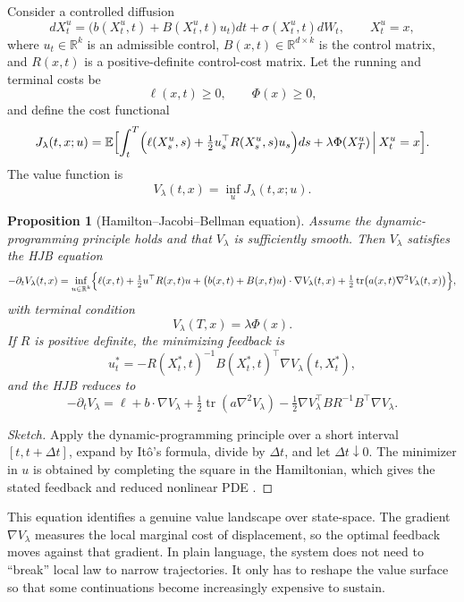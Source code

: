 \documentclass[12pt]{article}
\newtheorem{proposition}{Proposition}
\begin{document}
Consider a controlled diffusion
\[
dX_t^u = \bigl(b(X_t^u,t) + B(X_t^u,t)u_t\bigr)dt + \sigma(X_t^u,t)dW_t,
\qquad X_t^u = x,
\]
where $u_t \in \mathbb R^k$ is an admissible control, $B(x,t) \in \mathbb R^{d\times k}$ is the control matrix, and $R(x,t)$ is a positive-definite control-cost matrix. Let the running and terminal costs be
\[
\ell(x,t) \ge 0,
\qquad
\Phi(x) \ge 0,
\]
and define the cost functional
\[
J_\lambda(t,x;u) = \mathbb E\Bigl[\int_t^T \Bigl(\ell(X_s^u,s) + \tfrac12 u_s^\top R(X_s^u,s)u_s\Bigr)ds + \lambda \Phi(X_T^u)\,\Big|\,X_t^u=x\Bigr].
\]
The value function is
\[
V_\lambda(t,x) = \inf_u J_\lambda(t,x;u).
\]

\begin{proposition}[Hamilton--Jacobi--Bellman equation]
Assume the dynamic-programming principle holds and that $V_\lambda$ is sufficiently smooth. Then $V_\lambda$ satisfies the HJB equation
\[
-\partial_t V_\lambda(t,x)
= \inf_{u \in \mathbb R^k}
\Bigl\{
\ell(x,t) + \tfrac12 u^\top R(x,t)u + \bigl(b(x,t)+B(x,t)u\bigr)\cdot \nabla V_\lambda(t,x)
+ \tfrac12 \operatorname{tr}\bigl(a(x,t)\nabla^2 V_\lambda(t,x)\bigr)
\Bigr\},
\]
with terminal condition
\[
V_\lambda(T,x) = \lambda \Phi(x).
\]
If $R$ is positive definite, the minimizing feedback is
\[
u_t^* = -R(X_t^*,t)^{-1} B(X_t^*,t)^\top \nabla V_\lambda(t,X_t^*),
\]
and the HJB reduces to
\[
-\partial_t V_\lambda
= \ell + b\cdot \nabla V_\lambda + \tfrac12 \operatorname{tr}(a\nabla^2 V_\lambda)
- \tfrac12 \nabla V_\lambda^\top B R^{-1}B^\top \nabla V_\lambda.
\]
\end{proposition}

\begin{proof}[Sketch]
Apply the dynamic-programming principle over a short interval $[t,t+\Delta t]$, expand by It\^o's formula, divide by $\Delta t$, and let $\Delta t \downarrow 0$. The minimizer in $u$ is obtained by completing the square in the Hamiltonian, which gives the stated feedback and reduced nonlinear PDE \cite{fleming2006, whittle1990}. 
\end{proof}

This equation identifies a genuine value landscape over state-space. The gradient $\nabla V_\lambda$ measures the local marginal cost of displacement, so the optimal feedback moves against that gradient. In plain language, the system does not need to ``break'' local law to narrow trajectories. It only has to reshape the value surface so that some continuations become increasingly expensive to sustain.
\end{document}
